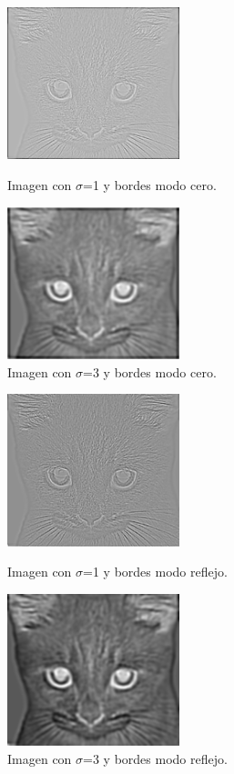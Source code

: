 \documentclass[12pt]{article}
\begin{document}
\begin{figure}[H]
\centering
\parbox{5cm}{
\includegraphics[width=5cm]{images/Lap1cero.png}
\caption{Imagen con $\sigma$=1 y bordes modo cero.}
\label{fig:2figsA}}
\qquad
\begin{minipage}{5cm}
\includegraphics[width=5cm]{images/Lap3cero.png}
\caption{Imagen con $\sigma$=3 y bordes modo cero.}
\label{fig:2figsB}
\end{minipage}
\end{figure}

\begin{figure}[H]
\centering
\parbox{5cm}{
\includegraphics[width=5cm]{images/Lap1reflejo.png}
\caption{Imagen con $\sigma$=1 y bordes modo reflejo.}
\label{fig:2figsA}}
\qquad
\begin{minipage}{5cm}
\includegraphics[width=5cm]{images/Lap3reflejo.png}
\caption{Imagen con $\sigma$=3 y bordes modo reflejo.}
\label{fig:2figsB}
\end{minipage}
\end{figure}
\end{document}
